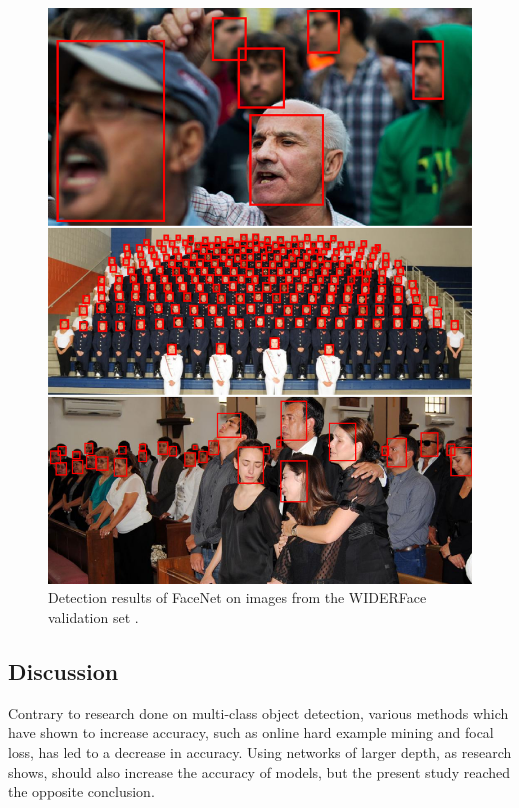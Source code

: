 \documentclass[a4paper, twoside]{article}
\begin{document}
\begin{figure}
\begin{center}
    \includegraphics[width=16cm]{bigface2.png}\caption{Detection results of FaceNet on images from the WIDERFace validation set \cite{WIDERFace}.} \label{figwiderfaceval}
\end{center}
\end{figure}

\subsection{Discussion}
Contrary to research done on multi-class object detection, various methods which have shown to increase accuracy, such as online hard example mining and focal loss, has led to a decrease in accuracy. Using networks of larger depth, as research \cite{retinanet} \cite{resnet} shows, should also increase the accuracy of models, but the present study reached the opposite conclusion.
\end{document}
